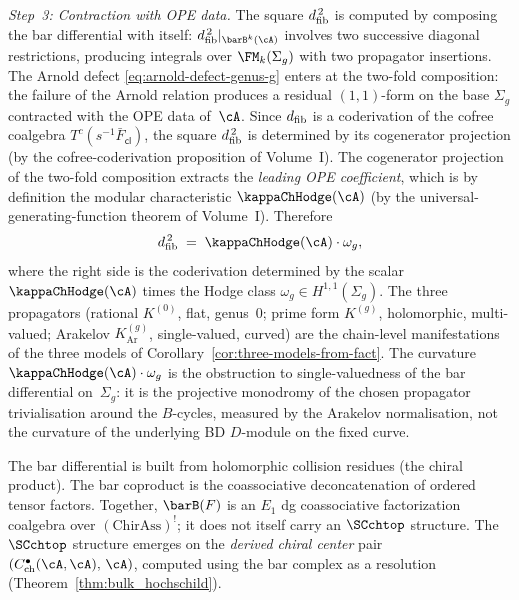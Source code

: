 \begin{construction}
\begin{enumerate}[label=\textup{(\roman*)}]
 \smallskip\noindent
 \emph{Step~3: Contraction with OPE data.}
 The square $d_{\mathrm{fib}}^{\,2}$ is computed by composing the bar
 differential with itself: $\dfib^{\,2}|_{\barB^k(\cA)}$
 involves two successive diagonal restrictions, producing
 integrals over $\FM_k(\Sigma_g)$ with two propagator
 insertions. The Arnold defect \eqref{eq:arnold-defect-genus-g}
 enters at the two-fold composition: the failure of the
 Arnold relation produces a residual $(1,1)$-form on the
 base $\Sigma_g$ contracted with the OPE data of~$\cA$.
 Since $d_{\mathrm{fib}}$ is a coderivation of the cofree coalgebra
 $T^c(s^{-1}\bar{F}_{\mathsf{cl}})$, the square
 $d_{\mathrm{fib}}^{\,2}$ is determined by its cogenerator projection
 \textup{(}by the cofree-coderivation proposition of
 Volume~I\textup{)}.
 The cogenerator projection of the two-fold composition
 extracts the \emph{leading OPE coefficient}, which is by
 definition the modular characteristic $\kappaChHodge(\cA)$
 \textup{(}by the universal-generating-function theorem of
 Volume~I\textup{)}.
 Therefore
 \[
 \dfib^{\,2}
 \;=\;
 \kappaChHodge(\cA) \cdot \omega_g,
 \]
 where the right side is the coderivation determined by the
 scalar $\kappaChHodge(\cA)$ times the Hodge class
 $\omega_g \in H^{1,1}(\Sigma_g)$.
 The three propagators (rational $K^{(0)}$, flat,
 genus~$0$; prime form $K^{(g)}$, holomorphic, multi-valued;
 Arakelov $K^{(g)}_{\mathrm{Ar}}$, single-valued, curved)
 are the chain-level manifestations of the three models of
 Corollary~\ref{cor:three-models-from-fact}. The curvature
 $\kappaChHodge(\cA) \cdot \omega_g$ is the obstruction to
 single-valuedness of the bar differential on~$\Sigma_g$:
 it is the projective monodromy of the chosen propagator
 trivialisation around the $B$-cycles, measured by the Arakelov
 normalisation, not the curvature of the underlying BD
 $D$-module on the fixed curve.
\end{enumerate}
The bar differential is built from holomorphic collision residues
(the chiral product).
The bar coproduct is the coassociative deconcatenation of ordered
tensor factors. Together,
$\barB(F)$ is an $E_1$ dg coassociative factorization coalgebra
over $(\mathrm{ChirAss})^!$; it does not itself carry an
$\SCchtop$ structure. The $\SCchtop$ structure emerges on the
\emph{derived chiral center} pair
$(C^\bullet_{\mathrm{ch}}(\cA,\cA),\, \cA)$, computed using the
bar complex as a resolution
(Theorem~\ref{thm:bulk_hochschild}).
\end{construction}

